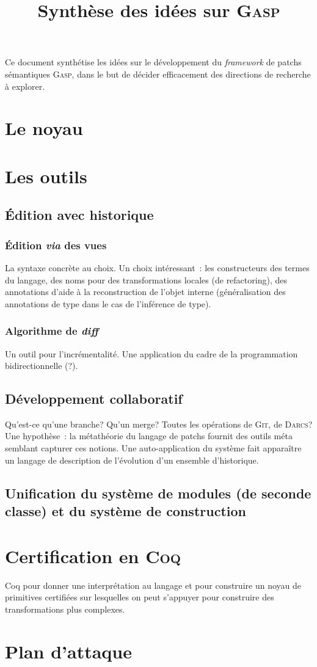 \documentclass{article}
\begin{document}
\title{Synthèse des idées sur \textsc{Gasp}}

Ce document synthétise les idées sur le développement du
\textit{framework} de patchs sémantiques \textsc{Gasp}, dans le but de
décider efficacement des directions de recherche à explorer.

\section{Le noyau}

\section{Les outils}

\subsection{Édition avec historique}

\subsubsection{Édition \textit{via} des vues}

La syntaxe concrète au choix. Un choix intéressant~: les constructeurs des termes du langage,
des noms pour des transformations locales (de refactoring), des annotations d'aide à la 
reconstruction de l'objet interne (généralisation des annotations de type dans le cas
de l'inférence de type). 

\subsubsection{Algorithme de \textit{diff}}

Un outil pour l'incrémentalité. Une application du cadre de la programmation bidirectionnelle (?). 

\subsection{Développement collaboratif}

Qu'est-ce qu'une branche? Qu'un merge? Toutes les opérations de \textsc{Git}, de \textsc{Darcs}? 
Une hypothèse~: la métathéorie du langage de patchs
fournit des outils méta semblant capturer ces notions. Une auto-application du système
fait apparaître un langage de description de l'évolution d'un ensemble d'historique. 

\subsection{Unification du système de modules (de seconde classe) et du système de construction}

\section{Certification en \textsc{Coq}}

Coq pour donner une interprétation au langage et pour construire un noyau de primitives
certifiées sur lesquelles on peut s'appuyer pour construire des transformations plus 
complexes. 

\section{Plan d'attaque}
\end{document}
